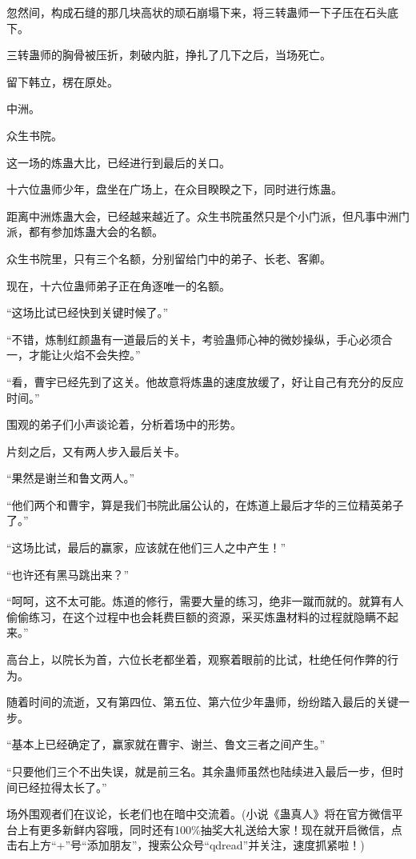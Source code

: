 \begin{this_body}
忽然间，构成石缝的那几块高状的顽石崩塌下来，将三转蛊师一下子压在石头底下。

三转蛊师的胸骨被压折，刺破内脏，挣扎了几下之后，当场死亡。

留下韩立，楞在原处。

中洲。

众生书院。

这一场的炼蛊大比，已经进行到最后的关口。

十六位蛊师少年，盘坐在广场上，在众目睽睽之下，同时进行炼蛊。

距离中洲炼蛊大会，已经越来越近了。众生书院虽然只是个小门派，但凡事中洲门派，都有参加炼蛊大会的名额。

众生书院里，只有三个名额，分别留给门中的弟子、长老、客卿。

现在，十六位蛊师弟子正在角逐唯一的名额。

“这场比试已经快到关键时候了。”

“不错，炼制红颜蛊有一道最后的关卡，考验蛊师心神的微妙操纵，手心必须合一，才能让火焰不会失控。”

“看，曹宇已经先到了这关。他故意将炼蛊的速度放缓了，好让自己有充分的反应时间。”

围观的弟子们小声谈论着，分析着场中的形势。

片刻之后，又有两人步入最后关卡。

“果然是谢兰和鲁文两人。”

“他们两个和曹宇，算是我们书院此届公认的，在炼道上最后才华的三位精英弟子了。”

“这场比试，最后的赢家，应该就在他们三人之中产生！”

“也许还有黑马跳出来？”

“呵呵，这不太可能。炼道的修行，需要大量的练习，绝非一蹴而就的。就算有人偷偷练习，在这个过程中也会耗费巨额的资源，采买炼蛊材料的过程就隐瞒不起来。”

高台上，以院长为首，六位长老都坐着，观察着眼前的比试，杜绝任何作弊的行为。

随着时间的流逝，又有第四位、第五位、第六位少年蛊师，纷纷踏入最后的关键一步。

“基本上已经确定了，赢家就在曹宇、谢兰、鲁文三者之间产生。”

“只要他们三个不出失误，就是前三名。其余蛊师虽然也陆续进入最后一步，但时间已经拉得太长了。”

场外围观者们在议论，长老们也在暗中交流着。(小说《蛊真人》将在官方微信平台上有更多新鲜内容哦，同时还有100\%抽奖大礼送给大家！现在就开启微信，点击右上方“+”号“添加朋友”，搜索公众号“qdread”并关注，速度抓紧啦！)

\end{this_body}

